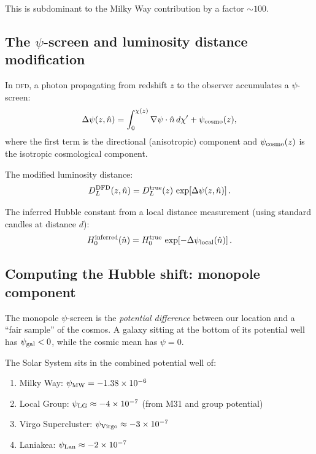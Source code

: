 \documentclass[aps,prl,twocolumn,superscriptaddress,showpacs]{revtex4-2}
\newcommand{\DFD}{\textsc{dfd}}
\begin{document}
This is subdominant to the Milky Way contribution by a factor
$\sim 100$.

\subsection{The $\psi$-screen and luminosity distance modification}

In \DFD, a photon propagating from redshift $z$ to the observer
accumulates a $\psi$-screen:
\begin{equation}
\Delta\psi(z,\hat{n}) = \int_0^{\chi(z)} \nabla\psi\cdot\hat{n}\,d\chi'
+ \psi_{\rm cosmo}(z),
\end{equation}
where the first term is the directional (anisotropic) component
and $\psi_{\rm cosmo}(z)$ is the isotropic cosmological component.

The modified luminosity distance:
\begin{equation}
D_L^{\rm DFD}(z,\hat{n}) = D_L^{\rm true}(z)\,
\exp\!\left[\Delta\psi(z,\hat{n})\right].
\end{equation}

The inferred Hubble constant from a local distance measurement
(using standard candles at distance $d$):
\begin{equation}
H_0^{\rm inferred}(\hat{n}) = H_0^{\rm true}\,
\exp\!\left[-\Delta\psi_{\rm local}(\hat{n})\right].
\end{equation}

\subsection{Computing the Hubble shift: monopole component}

The monopole $\psi$-screen is the \emph{potential difference}
between our location and a ``fair sample'' of the cosmos.
A galaxy sitting at the bottom of its potential well has
$\psi_{\rm gal} < 0$, while the cosmic mean has $\psi = 0$.

The Solar System sits in the combined potential well of:
\begin{enumerate}
\item Milky Way: $\psi_{\rm MW} = -1.38\times 10^{-6}$
\item Local Group: $\psi_{\rm LG} \approx -4\times 10^{-7}$
      (from M31 and group potential)
\item Virgo Supercluster: $\psi_{\rm Virgo} \approx -3\times 10^{-7}$
\item Laniakea: $\psi_{\rm Lan} \approx -2\times 10^{-7}$
\end{enumerate}
\end{document}

